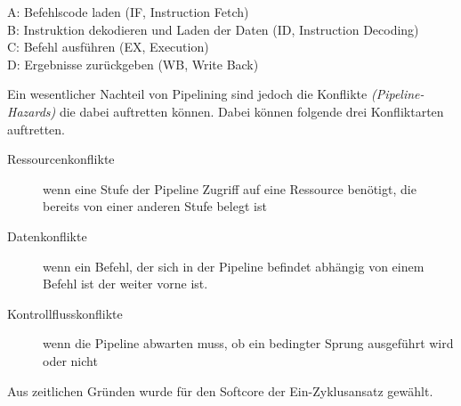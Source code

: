             \begin{description}
                \item[A: Befehlscode laden (IF, Instruction Fetch)] 
                \item[B: Instruktion dekodieren und Laden der Daten (ID, Instruction Decoding)] 
                \item[C: Befehl ausführen (EX, Execution)] 
                \item[D: Ergebnisse zurückgeben (WB, Write Back)] 
            \end{description}
            Ein wesentlicher Nachteil von Pipelining sind jedoch die Konflikte \textit{(Pipeline-Hazards)}
            die dabei auftretten können. Dabei können folgende drei Konfliktarten auftretten.

            \begin{description}
                \item[Ressourcenkonflikte] wenn eine Stufe der Pipeline Zugriff auf eine Ressource benötigt, die bereits von einer anderen Stufe belegt ist 
                \item[Datenkonflikte] wenn ein Befehl, der sich in der Pipeline befindet abhängig von einem Befehl ist der weiter vorne ist.
                \item[Kontrollflusskonflikte] wenn die Pipeline abwarten muss, ob ein bedingter Sprung ausgeführt wird oder nicht
            \end{description}
            Aus zeitlichen Gründen wurde für den Softcore der Ein-Zyklusansatz gewählt.
            

            

            



            
    
        

    
